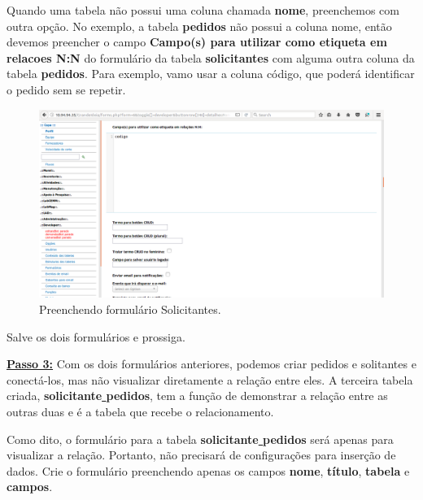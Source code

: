 \documentclass[9pt]{report}
\begin{document}
{       Quando uma tabela não possui uma coluna chamada \textbf{nome},
       preenchemos com outra opção. No exemplo, a tabela
       \textbf{pedidos} não possui a coluna nome, então devemos
       preencher o campo
       \textbf{Campo(s) para utilizar como etiqueta em relacoes N:N}
       do formulário da tabela \textbf{solicitantes} com alguma outra
       coluna da tabela \textbf{pedidos}. Para exemplo, vamo usar a
       coluna código, que poderá identificar o pedido sem se repetir.

       \begin{figure}[H]
        \includegraphics[width=\textwidth]{2_Formularios/4_Relacionamento_N_N/40.png}
        \caption{Preenchendo formulário Solicitantes.}
        \label{fig:formsolicitNN}
       \end{figure}

       Salve os dois formulários e prossiga.

       \underline{\textbf{Passo 3:}} Com os dois formulários
       anteriores, podemos criar pedidos e solitantes e conectá-los,
       mas não visualizar diretamente a relação entre eles. A
       terceira tabela criada,
       \textbf{solicitante\underline{ }pedidos}, tem a função de
       demonstrar a relação entre as outras duas e é a tabela que
       recebe o relacionamento.

       Como dito, o formulário para a tabela
       \textbf{solicitante\underline{ }pedidos} será apenas para
       visualizar a relação. Portanto, não precisará de configurações
       para inserção de dados. Crie o formulário preenchendo apenas
       os campos \textbf{nome}, \textbf{título}, \textbf{tabela} e
       \textbf{campos}.

}
\end{document}
